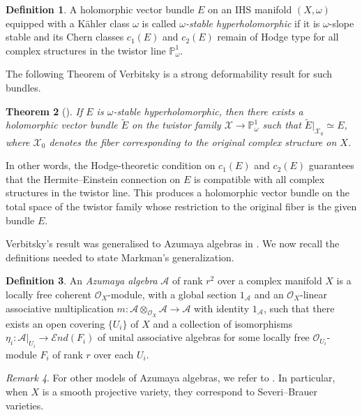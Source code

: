 \documentclass[12pt,a4paper]{amsart}
\theoremstyle{plain}
\newtheorem{thm}{Theorem}[section]
\theoremstyle{definition}
\newtheorem{df}[thm]{Definition}
\theoremstyle{remark}
\newtheorem{rmk}[thm]{Remark}
\newcommand{\kA}{\mathcal{A}}
\newcommand{\cc}{c}
\begin{document}
\begin{df}
A holomorphic vector bundle $E$ on an IHS manifold $(X,\omega)$ equipped with a Kähler class $\omega$ is called \textit{$\omega$-stable hyperholomorphic} if it is $\omega$-slope stable and its Chern classes $\cc_1(E)$ and $\cc_2(E)$ remain of Hodge type for all complex structures in the twistor line $\mathbb{P}^1_\omega$.
\end{df}

The following Theorem of Verbitsky is a strong deformability result for such bundles.

\begin{thm}[{\cite[Theorem~3.19]{verbitsky-hyperholomorphic-sheaves}}]\label{verb}
If $E$ is $\omega$-stable hyperholomorphic, then there exists a holomorphic vector bundle $\widetilde{E}$ on the twistor family $\mathcal{X}\rightarrow\mathbb{P}^1_\omega$ such that $\widetilde{E}|_{\mathcal{X}_0}\simeq E$, where $\mathcal{X}_0$ denotes the fiber corresponding to the original complex structure on $X$.
\end{thm}

In other words, the Hodge-theoretic condition on $\cc_1(E)$ and $\cc_2(E)$ guarantees that the Hermite--Einstein connection on $E$ is compatible with all complex structures in the twistor line. This produces a holomorphic vector bundle on the total space of the twistor family whose restriction to the original fiber is the given bundle $E$.

Verbitsky's result was generalised to Azumaya algebras in \cite{markman_bbf}. We now recall the definitions needed to state Markman's generalization.
\begin{df}
An \emph{Azumaya algebra} $\kA$ of rank $r^2$ over a complex manifold $X$ is a locally free coherent $\mathcal{O}_X$-module, with a global section $1_\kA$ and an $\mathcal{O}_X$-linear associative multiplication $m \colon \kA \otimes_{\mathcal{O}_X} \kA \longrightarrow \kA$ with identity $1_\kA$, such that there exists an open covering $\{U_i\}$ of $X$ and a collection of isomorphisms $\eta_i \colon \kA|_{U_i} \longrightarrow \mathcal{E}nd(F_i)$ of unital associative algebras for some locally free $\mathcal{O}_{U_i}$-module $F_i$ of rank $r$ over each $U_i$.
\end{df}
\begin{rmk}
For other models of Azumaya algebras, we refer to \cite[Section 2]{van-bree-gholampour-jiang-kool-pgl-sl}. In particular, when $X$ is a smooth projective variety, they correspond to Severi--Brauer varieties.
\end{rmk}
\end{document}
